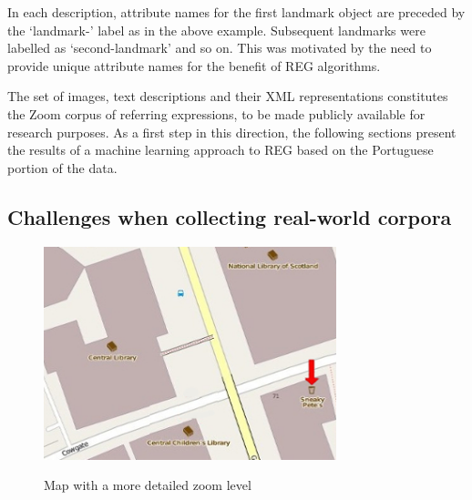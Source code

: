 \documentclass{article}
\begin{document}
In each description, attribute names for the first landmark object are preceded by the `landmark-' label as in the above example. Subsequent landmarks were labelled as `second-landmark' and so on. This was motivated by the need to provide unique attribute names for the benefit of REG algorithms.

The set of images, text descriptions and their XML representations constitutes the Zoom corpus of referring expressions, to be made publicly available for research purposes. As a first step in this direction, the following sections present the results of a machine learning approach to REG based on the Portuguese portion of the data.


\subsection{Challenges when collecting real-world corpora}
\label{sec-problems}

\begin{figure}[ht]
\begin{center}
\includegraphics[width=8.5cm]{figures/with-zoom.jpg}\\[0pt]
\caption{Map with a more detailed zoom level}
\label{fig-with-zoom}
\end{center}
\end{figure}
\end{document}
